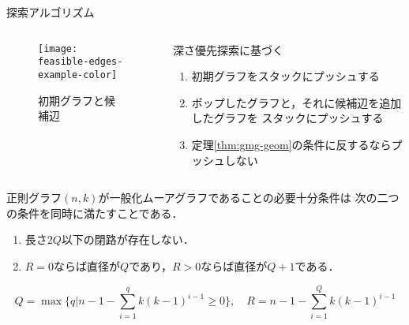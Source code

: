 \begin{frame}[allowframebreaks]{探索アルゴリズム}
  \begin{columns}
    \begin{column}{.4\textwidth}
      \begin{figure}
        \centering
        \texttt{[image: feasible-edges-example-color]}
        \caption{初期グラフと候補辺}
      \end{figure}
    \end{column}
    \begin{column}{.6\textwidth}
      \small
      \par 深さ優先探索に基づく
      \begin{enumerate}
      \item 初期グラフをスタックにプッシュする
      \item ポップしたグラフと，それに候補辺を追加したグラフを
        スタックにプッシュする
      \item 定理\ref{thm:gmg-geom}の条件に反するならプッシュしない
      \end{enumerate}
    \end{column}
  \end{columns}
  \vspace*{-1em}
  \begin{theorem}
    \label{thm:gmg-geom}
    {\scriptsize
    正則グラフ$(n,k)$が一般化ムーアグラフであることの必要十分条件は
    次の二つの条件を同時に満たすことである．
    \begin{enumerate}
    \item 長さ$2Q$以下の閉路が存在しない．
      \label{itm:gmg-geom-1}
    \item $R=0$ならば直径が$Q$であり，$R>0$ならば直径が$Q+1$である．
      \label{itm:gmg-geom-2}
    \end{enumerate}
    \[ Q=\max\{q|n-1-\sum_{i=1}^{q}k(k-1)^{i-1}\geq 0\},\quad
    R=n-1-\sum_{i=1}^{Q}k(k-1)^{i-1} \]
    }
  \end{theorem}
\end{frame}

